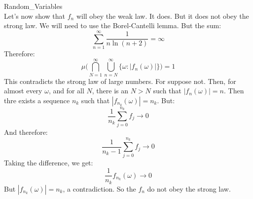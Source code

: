 \begin{lexample}{}{Random_Variables}
\begin{equation}
        \end{equation}
        Let's now show that $f_{n}$ will obey the weak law.
        It does. But it does not obey the strong law. We will
        need to use the Borel-Cantelli lemma. But the sum:
        \begin{equation}
            \sum_{n=1}^{\infty}\frac{1}{n\ln(n+2)}=\infty
        \end{equation}
        Therefore:
        \begin{equation}
            \mu\Big(\bigcap_{N=1}^{\infty}\bigcup_{n=N}^{\infty}
                \{\omega:|f_{n}(\omega)|\}\Big)=1
        \end{equation}
        This contradicts the strong law of large numbers. For
        suppose not. Then, for almost every $\omega$, and for
        all $N$, there is an $N>N$ such that
        $|f_{n}(\omega)|=n$. Then thre exists a sequence
        $n_{k}$ such that $|f_{n_{k}}(\omega)|=n_{k}$.
        But:
        \begin{equation}
            \frac{1}{n_{k}}\sum_{j=0}^{n_{k}}f_{j}\rightarrow{0}
        \end{equation}
        And therefore:
        \begin{equation}
            \frac{1}{n_{k}-1}\sum_{j=0}^{n_{k}}f_{j}
                \rightarrow{0}
        \end{equation}
        Taking the difference, we get:
        \begin{equation}
            \frac{1}{n_{k}}f_{n_{k}}(\omega)\rightarrow{0}
        \end{equation}
        But $|f_{n_{k}}(\omega)|=n_{k}$, a contradiction.
        So the $f_{n}$ do not obey the strong law.
    \end{lexample}
